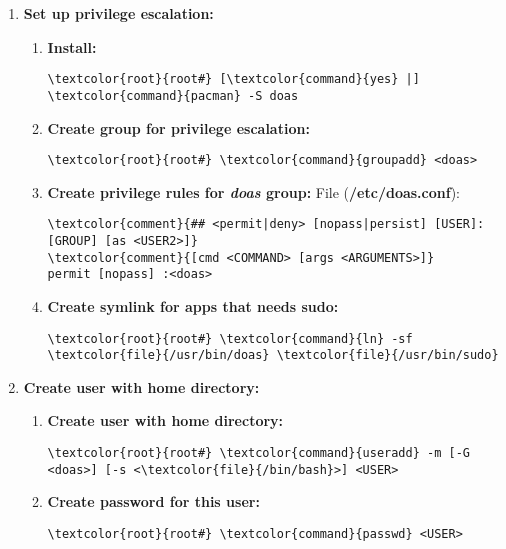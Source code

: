 \documentclass[10pt, a4paper, onecolumn, openany]{book} %
\begin{document}
\begin{enumerate}
    \item \textbf{Set up privilege escalation:}
    \begin{enumerate}
        \item \textbf{Install:}
\begin{Verbatim}[commandchars=\\\{\}]
\textcolor{root}{root#} [\textcolor{command}{yes} |] \textcolor{command}{pacman} -S doas
\end{Verbatim}
        \item \textbf{Create group for privilege escalation:}
\begin{Verbatim}[commandchars=\\\{\}]
\textcolor{root}{root#} \textcolor{command}{groupadd} <doas>
\end{Verbatim}
        \item \textbf{Create privilege rules for \textit{doas} group:}
\newline File (\textbf{\textcolor{file}{/etc/doas.conf}}):
\begin{Verbatim}[commandchars=\\\{\}]
\textcolor{comment}{## <permit|deny> [nopass|persist] [USER]:[GROUP] [as <USER2>]}
\textcolor{comment}{[cmd <COMMAND> [args <ARGUMENTS>]}
permit [nopass] :<doas>
\end{Verbatim}
    \item \textbf{Create symlink for apps that needs sudo:}
\begin{Verbatim}[commandchars=\\\{\}]
\textcolor{root}{root#} \textcolor{command}{ln} -sf \textcolor{file}{/usr/bin/doas} \textcolor{file}{/usr/bin/sudo}
\end{Verbatim}
    \end{enumerate}
    
    \item \textbf{Create user with home directory:}
    \begin{enumerate}
        \item \textbf{Create user with home directory:}
\begin{Verbatim}[commandchars=\\\{\}]
\textcolor{root}{root#} \textcolor{command}{useradd} -m [-G <doas>] [-s <\textcolor{file}{/bin/bash}>] <USER>
\end{Verbatim}
        \item \textbf{Create password for this user:}
\begin{Verbatim}[commandchars=\\\{\}]
\textcolor{root}{root#} \textcolor{command}{passwd} <USER>
\end{Verbatim}
    \end{enumerate}
\end{enumerate}
\end{document}
